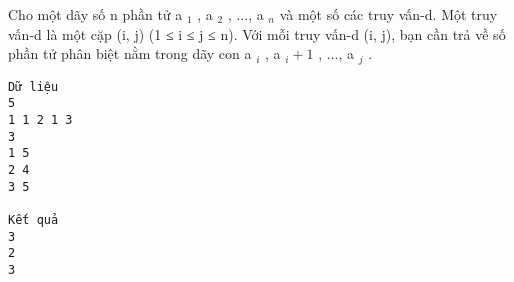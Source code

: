 Cho một dãy số n phần tử a   $_    1   $   ,   a   $_    2   $   , ..., a   $_    n   $   và một số các truy vấn-d. Một truy vấn-d là một cặp (i, j) (1 ≤ i   ≤ j ≤ n). Với mỗi truy vấn-d (i, j), bạn cần trả về số phần   tử phân biệt nằm trong dãy con a   $_    i   $   ,   a   $_    i+1   $   , ..., a   $_    j   $   .
\begin{verbatim}
Dữ liệu
5
1 1 2 1 3
3
1 5
2 4
3 5

Kết quả
3
2
3 
\end{verbatim}